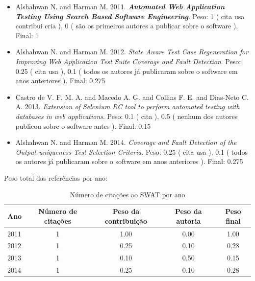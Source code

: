 \begin{itemize}
\item Alshahwan N. and Harman M.
      2011.
        \textbf{\textit{ Automated Web Application Testing Using Search Based Software Engineering}}.
      Peso:
      1 (
          cita
          usa
          contribui
          cria
      ),
      0 (
são os primeiros autores a publicar sobre o software
      ).
      Final:
      1

\item Alshahwan N. and Harman M.
      2012.
        \textit{ State Aware Test Case Regeneration for Improving Web Application Test Suite Coverage and Fault Detection}.
      Peso:
      0.25 (
          cita
          usa
      ),
      0.1 (
todos os autores já publicaram sobre o software em anos anteriores
      ).
      Final:
      0.275

\item Castro de V. F. M. A. and Macedo A. G. and Collins F. E. and Dias-Neto C. A.
      2013.
        \textit{ Extension of Selenium RC tool to perform automated testing with databases in web applications}.
      Peso:
      0.1 (
          cita
      ),
      0.5 (
nenhum dos autores publicou sobre o software antes
      ).
      Final:
      0.15

\item Alshahwan N. and Harman M.
      2014.
        \textit{ Coverage and Fault Detection of the Output-uniqueness Test Selection Criteria}.
      Peso:
      0.25 (
          cita
          usa
      ),
      0.1 (
todos os autores já publicaram sobre o software em anos anteriores
      ).
      Final:
      0.275

\end{itemize}

Peso total das referências por ano:

\begin{table}[h]
\caption{Número de citações ao SWAT  por ano}
\centering
\begin{tabular}{| l | c | c | c | c |}
  \hline
  Ano & Número de citações & Peso da contribuição & Peso da autoria & Peso final \\
  \hline
  2011
    & 1
    & 1.00
    & 0.00
    & 1.00 \\
  2012
    & 1
    & 0.25
    & 0.10
    & 0.28 \\
  2013
    & 1
    & 0.10
    & 0.50
    & 0.15 \\
  2014
    & 1
    & 0.25
    & 0.10
    & 0.28 \\
  \hline
\end{tabular}
\end{table}


